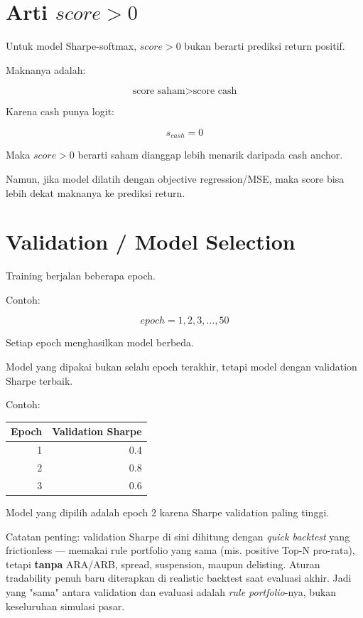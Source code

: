 \documentclass[11pt,a4paper]{article}
\begin{document}
\section{Arti \texorpdfstring{$score > 0$}{score > 0}}

Untuk model Sharpe-softmax, \(score > 0\) bukan berarti prediksi return positif.

Maknanya adalah:

\[
\boxed{
\text{score saham} > \text{score cash}
}
\]

Karena cash punya logit:

\[
s_{cash}=0
\]

Maka \(score > 0\) berarti saham dianggap lebih menarik daripada cash anchor.

Namun, jika model dilatih dengan objective regression/MSE, maka score bisa lebih dekat
maknanya ke prediksi return.

\section{Validation / Model Selection}

Training berjalan beberapa epoch.

Contoh:

\[
epoch = 1,2,3,\ldots,50
\]

Setiap epoch menghasilkan model berbeda.

Model yang dipakai bukan selalu epoch terakhir, tetapi model dengan validation Sharpe terbaik.

Contoh:

\begin{center}
\begin{tabular}{rr}
\toprule
Epoch & Validation Sharpe \\
\midrule
1 & 0.4 \\
2 & 0.8 \\
3 & 0.6 \\
\bottomrule
\end{tabular}
\end{center}

Model yang dipilih adalah epoch 2 karena Sharpe validation paling tinggi.

Catatan penting: validation Sharpe di sini dihitung dengan \emph{quick backtest}
yang frictionless --- memakai rule portfolio yang sama (mis. positive Top-N
pro-rata), tetapi \textbf{tanpa} ARA/ARB, spread, suspension, maupun delisting.
Aturan tradability penuh baru diterapkan di realistic backtest saat evaluasi
akhir. Jadi yang "sama" antara validation dan evaluasi adalah \emph{rule
portfolio}-nya, bukan keseluruhan simulasi pasar.
\end{document}
